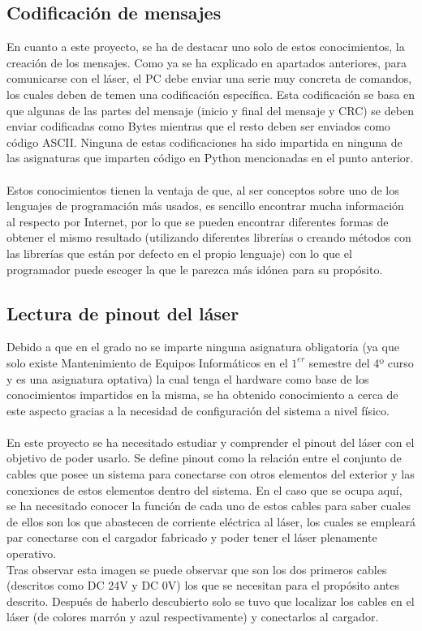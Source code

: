 \subsection{Codificación de mensajes}
En cuanto a este proyecto, se ha de destacar uno solo de estos conocimientos, la creación de los mensajes. Como ya se ha explicado en apartados anteriores, para comunicarse con el láser, el PC debe enviar una serie muy concreta de comandos, los cuales deben de temen una codificación específica. Esta codificación se basa en que algunas de las partes del mensaje (inicio y final del mensaje y CRC) se deben enviar codificadas como Bytes mientras que el resto deben ser enviados como código ASCII. Ninguna de estas codificaciones ha sido impartida en ninguna de las asignaturas que imparten código en Python mencionadas en el punto anterior.\\
\\
Estos conocimientos tienen la ventaja de que, al ser conceptos sobre uno de los  lenguajes de programación más usados, es sencillo encontrar mucha información al respecto por Internet, por lo que se pueden encontrar diferentes formas de obtener el mismo  resultado (utilizando diferentes librerías o creando métodos con las librerías que están por defecto en el propio lenguaje) con lo que el programador puede escoger la que le parezca más idónea para su propósito.\\

\subsection{Lectura de pinout del láser}
Debido a que en el grado no se imparte ninguna asignatura obligatoria (ya que solo existe Mantenimiento de Equipos  Informáticos en el $1^{er}$ semestre del 4º curso y es una asignatura optativa) la cual tenga el hardware como base de los conocimientos impartidos en la misma, se ha obtenido conocimiento a cerca de este aspecto gracias a la necesidad de configuración del sistema a nivel físico.\\
\\
En este proyecto se ha necesitado estudiar y comprender el pinout del láser con el objetivo de poder usarlo. Se define pinout como la relación entre el conjunto de cables que posee un sistema para conectarse con otros elementos del exterior y las conexiones de estos elementos dentro del sistema. En el caso que se ocupa aquí, se ha necesitado conocer la función de cada uno de estos cables para saber cuales de ellos son los que abastecen de corriente eléctrica al láser, los cuales se empleará par conectarse con el cargador fabricado y poder tener el láser plenamente operativo.\\
Tras observar esta imagen se puede observar que son los dos primeros cables (descritos como DC 24V y DC 0V) los que se necesitan para el propósito antes descrito. Después de haberlo descubierto solo se tuvo que localizar los cables en el láser (de colores marrón y azul respectivamente) y conectarlos al cargador.\\

